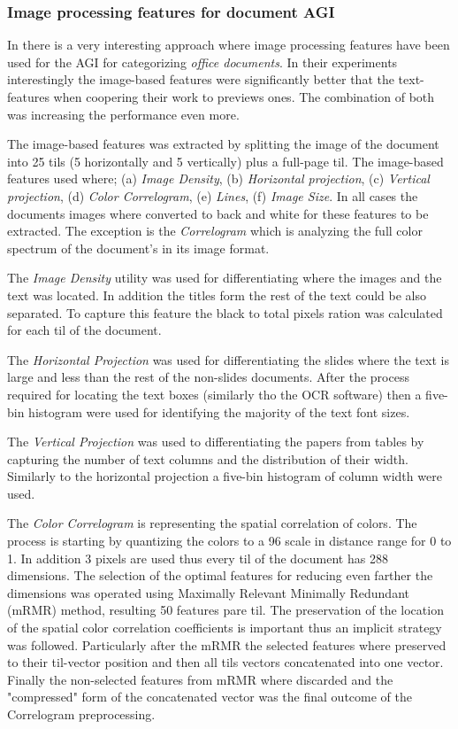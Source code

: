 \subsubsection{Image processing features for document AGI}
In \parencite{chen2012genre} there is a very interesting approach where image processing features have been used for the AGI for categorizing \textit{office documents}. In their experiments interestingly the image-based features were significantly better that the text-features when coopering their work to previews ones. The combination of both was increasing the performance even more.

The image-based features was extracted by splitting the image of the document into 25 tils (5 horizontally and 5 vertically) plus a full-page til. The image-based features used where; (a) \textit{Image Density}, (b) \textit{Horizontal projection}, (c) \textit{Vertical projection}, (d) \textit{Color Correlogram}, (e) \textit{Lines}, (f) \textit{Image Size}. In all cases the documents images where converted to back and white for these features to be extracted. The exception is the \textit{Correlogram} which is analyzing the full color spectrum of the document's in its image format.

The \textit{Image Density} utility was used for differentiating where the images and the text was located. In addition the titles form the rest of the text could be also separated. To capture this feature the black to total pixels ration was calculated for each til of the document. 

The \textit{Horizontal Projection} was used for differentiating the slides where the text is large and less than the rest of the non-slides documents. After the process required for locating the text boxes (similarly tho the OCR software) then a five-bin histogram were used for identifying the majority of the text font sizes.

The \textit{Vertical Projection} was used to differentiating the papers from tables by capturing the number of text columns and the distribution of their width. Similarly to the horizontal projection a five-bin histogram of column width were used.

The \textit{Color Correlogram} is representing the spatial correlation of colors. The process is starting by quantizing the colors to a 96 scale in distance range for 0 to 1. In addition 3 pixels are used thus every til of the document has 288 dimensions. The selection of the optimal features for reducing even farther the dimensions was operated using Maximally Relevant Minimally Redundant (mRMR) method, resulting 50 features pare til. The preservation of the location of the spatial color correlation coefficients is important thus an implicit strategy was followed. Particularly after the mRMR the selected features where preserved to their til-vector position and then all tils vectors concatenated into one vector. Finally the non-selected features from mRMR where discarded and the "compressed" form of the concatenated vector was the final outcome of the Correlogram preprocessing.

